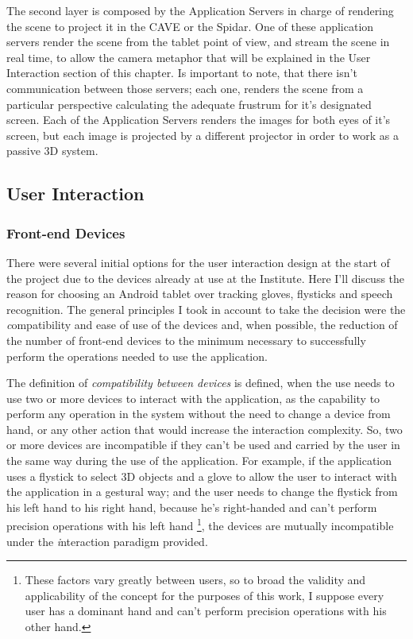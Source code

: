 The second layer is composed by the Application Servers in charge of rendering the scene to project it in the CAVE or the Spidar. One of these application servers render the scene from the tablet point of view, and stream the scene in real time, to allow the camera metaphor that will be explained in the User Interaction section of this chapter. Is important to note, that there isn't communication between those servers; each one, renders the scene from a particular perspective calculating the adequate frustrum for it's designated screen. Each of the Application Servers renders the images for both eyes of it's screen, but each image is projected by a different projector in order to work as a passive 3D system.
\subsection{User Interaction}

\subsubsection{Front-end Devices}
There were several initial options for the user interaction design at the start of the project due to the devices already at use at the Institute. Here I'll discuss the reason for choosing an Android tablet over tracking gloves, flysticks and speech recognition. The general principles I took in account to take the decision were the {\emph compatibility} and ease of use of the devices and, when possible, the reduction of the number of front-end devices to the minimum necessary to successfully perform the operations needed to use the application.

The definition of \emph{compatibility between devices} is defined, when the use needs to use two or more devices to interact with the application, as the capability to perform any operation in the system without the need to change a device from hand, or any other action that would increase the interaction complexity. So, two or more devices are incompatible if they can't be used and carried by the user in the same way during the use of the application. For example, if the application uses a flystick to select 3D objects and a glove to allow the user to interact with the application in a gestural way; and the user needs to change the flystick from his left hand to his right hand, because he's right-handed and can't perform precision operations with his left hand \footnote{These factors vary greatly between users, so to broad the validity and applicability of the concept for the purposes of this work, I suppose every user has a dominant hand and can't perform precision operations with his other hand.}, the devices are mutually incompatible under the {\emph interaction paradigm} provided.

